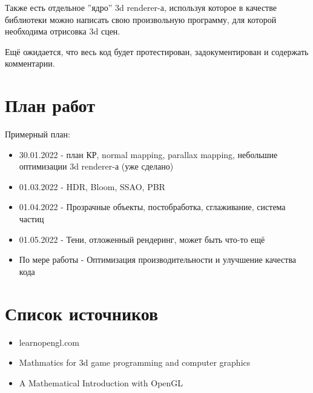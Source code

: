 \documentclass[12pt]{article}
\begin{document}
Также есть отдельное ''ядро'' 3d renderer-а, используя которое в качестве библиотеки можно написать свою произвольную программу, для которой необходима отрисовка 3d сцен.

Ещё ожидается, что весь код будет протестирован, задокументирован и содержать комментарии.

\section{План работ}
Примерный план:
\begin{itemize}

\item 30.01.2022 - план КР, normal mapping, parallax mapping, небольшие оптимизации 3d renderer-а (уже сделано)
\item 01.03.2022 - HDR, Bloom, SSAO, PBR
\item 01.04.2022 - Прозрачные объекты, постобработка, сглаживание, система частиц
\item 01.05.2022 - Тени, отложенный рендеринг, может быть что-то ещё
\item По мере работы - Оптимизация производительности и улучшение качества кода

\end{itemize}

\section{Список источников}

\begin{itemize}
\item learnopengl.com ~\cite{learnopengl}
\item Mathmatics for 3d game programming and computer graphics ~\cite{Math3d}
\item A Mathematical Introduction with OpenGL ~\cite{LRN}
\end{itemize}

\renewcommand{\refname}{}







\end{document}

